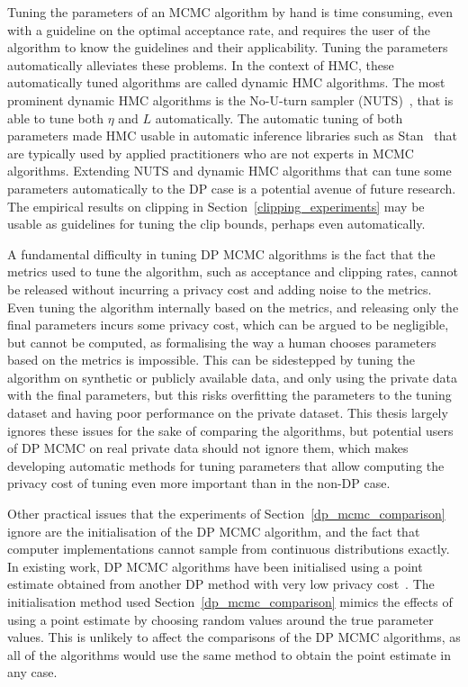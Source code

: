 \documentclass[english,twoside,openright]{HYgraduMLDS}
\begin{document}
Tuning the parameters of an MCMC algorithm by hand is time consuming,
even with a guideline on the optimal acceptance rate, and requires the user of
the algorithm to know the guidelines and their applicability. Tuning the
parameters automatically alleviates these problems. In the context of HMC, these
automatically tuned algorithms are called dynamic HMC algorithms. The most
prominent dynamic HMC algorithms is the No-U-turn sampler (NUTS)~\cite{HoG14},
that is able to tune both \(\eta\) and \(L\) automatically.
The automatic tuning of both parameters made HMC usable in automatic inference
libraries such as
Stan~\cite{stan} that are typically used by applied practitioners who are not
experts in MCMC algorithms. Extending NUTS and dynamic HMC algorithms that
can tune some parameters automatically to the DP case is a potential avenue of
future research. The empirical results on clipping in
Section~\ref{clipping_experiments} may be usable as guidelines for tuning the
clip bounds, perhaps even automatically.

A fundamental difficulty in tuning DP MCMC algorithms is the fact that the
metrics used to tune the algorithm, such as acceptance and clipping rates,
cannot be released without incurring a privacy cost and adding noise to the
metrics. Even tuning the algorithm
internally based on the metrics, and releasing only the final parameters incurs
some privacy cost, which can be argued to be negligible, but cannot be
computed, as formalising the way a human chooses parameters based on the metrics
is impossible. This can be sidestepped by tuning the algorithm on synthetic or
publicly available data, and only using the private data with the final parameters,
but this risks overfitting the parameters to the tuning dataset and having
poor performance on the private dataset.
This thesis largely ignores these issues for the sake of comparing
the algorithms, but potential users of DP MCMC on real private data should not
ignore them, which makes developing automatic methods for tuning parameters
that allow computing the privacy cost of tuning
even more important than in the non-DP case.

Other practical issues that the experiments of Section~\ref{dp_mcmc_comparison}
ignore are the initialisation of the DP MCMC algorithm, and the fact that
computer implementations cannot sample from continuous distributions exactly.
In existing work, DP MCMC algorithms have been initialised using a point
estimate obtained from another DP method with very low privacy
cost~\cite{HeikkilaJDH19, WFS15}. The initialisation method used
Section~\ref{dp_mcmc_comparison} mimics the effects of using a point estimate by
choosing random values around the true parameter values. This is unlikely to
affect the comparisons of the DP MCMC algorithms, as all of the algorithms
would use the same method to obtain the point estimate in any case.
\end{document}
